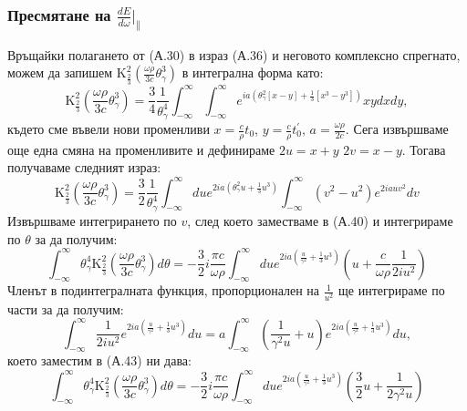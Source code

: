 \begin{appendices}
\subsubsection{Пресмятане на $\frac{dE}{d\omega}\big\vert_\parallel$}
Връщайки полагането от (А.30) в израз (А.36) и неговото комплексно спрегнато, можем да запишем $\text{K}^2_{\frac{2}{3}}\left(\frac{\omega\rho}{3 c}\theta_\gamma^3\right)$ в интегрална форма като:
\begin{equation}
\text{K}^2_{\frac{2}{3}}\left(\frac{\omega\rho}{3 c}\theta_\gamma^3\right) = 	\frac{3}{4}\frac{1}{\theta_\gamma^4}\int_{-\infty}^\infty \int_{-\infty}^\infty e^{ia\left(\theta_\gamma^2[x - y] + \frac{1}{3}[x^3 - y^3]\right)}xydxdy,
\end{equation}
където сме въвели нови променливи $x = \frac{c}{\rho}t_0$, $y = \frac{c}{\rho} t_0^\prime$, $a = \frac{\omega\rho}{2c}$. Сега извършваме още една смяна на променливите и дефинираме $2u = x + y$ $2v = x - y$. Тогава получаваме следният израз:
\begin{equation}
	\text{K}^2_{\frac{2}{3}}\left(\frac{\omega\rho}{3 c}\theta_\gamma^3\right) = 	\frac{3}{2}\frac{1}{\theta_\gamma^4}\int_{-\infty}^\infty du e^{2ia\left(\theta_\gamma^2 u + \frac{1}{3}u^3\right)}\int_{-\infty}^{\infty}\left(v^2 - u^2\right)e^{2iauv^2}dv
\end{equation}
Извършваме интегрирането по $v$, след което заместваме в (А.40) и интегрираме по $\theta$ за да получим:
\begin{equation}
	\int_{-\infty}^\infty \theta_\gamma^4 \text{K}^2_{\frac{2}{3}}\left(\frac{\omega\rho}{3 c}\theta_\gamma^3\right)d\theta = -\frac{3}{2}i\frac{\pi c}{\omega\rho}\int_{-\infty}^\infty du e^{2ia\left(\frac{u}{\gamma^2} + \frac{1}{3}u^3\right)}\left(u + \frac{c}{\omega\rho}\frac{1}{2iu^2}\right)
\end{equation}
Членът в подинтегралната функция, пропорционален на $\frac{1}{u^2}$ ще интегрираме по части за да получим:
\begin{equation}
	\int_{-\infty}^\infty \frac{1}{2iu^2}e^{2ia\left(\frac{u}{\gamma^2}+\frac{1}{3}u^3\right)}du = a\int_{-\infty}^\infty \left(\frac{1}{\gamma^2 u} + u\right)e^{2ia\left(\frac{u}{\gamma^2}+\frac{1}{3}u^3\right)}du,
\end{equation}
което заместим в (А.43) ни дава:
\begin{equation}
	\int_{-\infty}^\infty \theta_\gamma^4 \text{K}^2_{\frac{2}{3}}\left(\frac{\omega\rho}{3 c}\theta_\gamma^3\right)d\theta = -\frac{3}{2}i\frac{\pi c}{\omega\rho}\int_{-\infty}^\infty du e^{2ia\left(\frac{u}{\gamma^2} + \frac{1}{3}u^3\right)}\left(\frac{3}{2}u + \frac{1}{2\gamma^2u}\right)

\end{equation}
\end{appendices}
